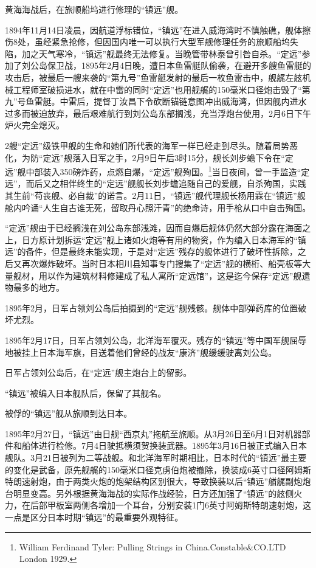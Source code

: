 \documentclass[12pt,UTF8]{ctexbook}
\begin{document}
黄海海战后，在旅顺船坞进行修理的“镇远”舰。

1894年11月14日凌晨，因航道浮标错位，“镇远”在进入威海湾时不慎触礁，舰体擦伤8处，虽经紧急抢修，但因国内唯一可以执行大型军舰修理任务的旅顺船坞失陷，加之天气寒冷，“镇远”舰最终无法修复。当晚管带林泰曾引咎自杀。“定远”参加了刘公岛保卫战，1895年2月4日晚，遭日本鱼雷艇队偷袭，在避开多艘鱼雷艇的攻击后，被最后一艘来袭的“第九号”鱼雷艇发射的最后一枚鱼雷击中，舰艉左舷机械工程师室破损进水，就在中雷的同时“定远”也用舰艉的150毫米口径炮击毁了“第九”号鱼雷艇。中雷后，提督丁汝昌下令砍断锚链意图冲出威海湾，但因舰内进水过多而被迫放弃，最后艰难航行到刘公岛东部搁浅，充当浮炮台使用，2月6日下午炉火完全熄灭。

2艘“定远”级铁甲舰的生命和她们所代表的海军一样已经走到尽头。随着局势恶化，为防“定远”舰落入日军之手，2月9日午后3时15分，舰长刘步蟾下令在“定远”舰中部装入350磅炸药，点燃自爆，“定远”舰殉国。\footnote{William Ferdinand Tyler: Pulling Strings in China.Constable\&CO.LTD London 1929.}当日夜间，曾一手监造“定远”，而后又之相伴终生的“定远”舰舰长刘步蟾追随自己的爱舰，自杀殉国，实践其生前“苟丧舰、必自裁”的诺言。2月11日，“镇远”舰代理舰长杨用霖在“镇远”舰舱内吟诵“人生自古谁无死，留取丹心照汗青”的绝命诗，用手枪从口中自击殉国。

“定远”舰由于已经搁浅在刘公岛东部浅滩，因而自爆后舰体仍然大部分露在海面之上，日方原计划拆运“定远”舰上诸如火炮等有用的物资，作为编入日本海军的“镇远”的备件，但是最终未能实现，于是对“定远”残存的舰体进行了破坏性拆除，之后又再次爆炸破坏。当时日本相川县知事专门搜集了“定远”舰的横桁、船壳板等大量舰材，用以作为建筑材料修建成了私人寓所“定远馆”，这是迄今保存“定远”舰遗物最多的地方。

1895年2月，日军占领刘公岛后拍摄到的“定远”舰残骸。舰体中部弹药库的位置破坏尤烈。

1895年2月17日，日军占领刘公岛，北洋海军覆灭。残存的“镇远”等中国军舰屈辱地被挂上日本海军旗，目送着他们曾经的战友“康济”舰缓缓驶离刘公岛。

日军占领刘公岛后，在“定远”舰主炮台上的留影。

“镇远”被编入日本舰队后，保留了其舰名。

被俘的“镇远”舰从旅顺到达日本。

1895年2月27日，“镇远”由日舰“西京丸”拖航至旅顺。从3月26日至6月1日对机器部件和船体进行检修。7月4日驶抵横须贺换装武器。1895年3月16日被正式编入日本舰队。3月21日被列为二等战舰。和北洋海军时期相比，日本时代的“镇远”最主要的变化是武备，原先舰艉的150毫米口径克虏伯炮被撤除，换装成6英寸口径阿姆斯特朗速射炮，由于两类火炮的炮架结构区别很大，导致换装以后“镇远”艏艉副炮炮台明显变高。另外根据黄海海战的实际作战经验，日方还加强了“镇远”的舷侧火力，在后部甲板室两侧各增加一个耳台，分别安装1门6英寸阿姆斯特朗速射炮，这一点是区分日本时期“镇远”的最重要外观特征。
\end{document}

